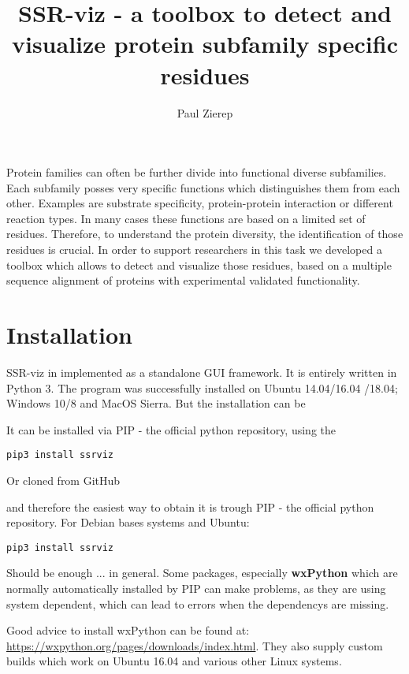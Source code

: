 \documentclass[a4paper,10pt]{article}
\title{SSR-viz - a toolbox to detect and visualize protein
subfamily specific residues}
\author{Paul Zierep}
\begin{document}
\maketitle

\begin{abstract}


\end{abstract}
Protein families can often be further divide into 
functional diverse subfamilies. Each subfamily posses very specific functions
which distinguishes them from each other. Examples are substrate specificity,
protein-protein interaction or different reaction types. In many cases these functions are
based on a limited set of residues. Therefore, to understand the protein diversity,
the identification of those residues is crucial.
In order to support researchers in this task we developed a toolbox
which allows to detect and visualize those residues, based on a multiple sequence 
alignment of proteins with experimental validated functionality.

\pagebreak
\tableofcontents
\pagebreak


\section{Installation}

SSR-viz in implemented as a standalone GUI framework. It is entirely 
written in Python 3. The program was successfully installed on
Ubuntu 14.04/16.04 /18.04; Windows 10/8 and MacOS Sierra. But the 
installation can be 


It can be installed via PIP - the official python repository, using the 

\texttt{pip3 install ssrviz}

Or cloned from GitHub \todo{}


and therefore the easiest way to obtain it is trough 
PIP - the official python repository. For Debian bases systems and Ubuntu:

\begin{verbatim}
pip3 install ssrviz
\end{verbatim}

Should be enough ... in general. Some packages, especially \textbf{wxPython} 
which are normally automatically installed
by PIP can make problems, as they are using system dependent, which can 
lead to errors when the dependencys are missing. 

Good advice to install wxPython can be 
found at: \url{https://wxpython.org/pages/downloads/index.html}.
They also supply custom builds which work on Ubuntu 16.04 and various other
Linux systems.
\end{document}
